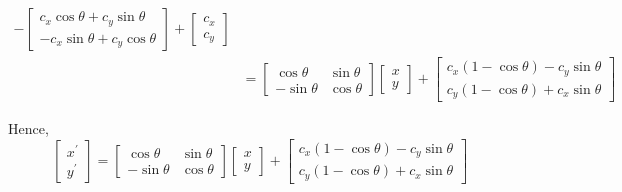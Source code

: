 \begin{equation*}
\begin{split}
          - \begin{bmatrix} c_{x}\cos\theta + c_{y}\sin\theta \\ -c_{x}\sin\theta + c_{y}\cos\theta \end{bmatrix} +
           \begin{bmatrix} c_{x} \\ c_{y} \end{bmatrix} \\
          &= \begin{bmatrix} \cos\theta & \sin\theta \\ -\sin\theta & \cos\theta \end{bmatrix} \begin{bmatrix} x \\ y \end{bmatrix}
          + \begin{bmatrix} c_{x}(1 - \cos\theta) - c_{y}\sin\theta \\ c_{y}(1 - \cos\theta) + c_{x}\sin\theta \end{bmatrix}
\end{split}
\end{equation*}

Hence,
\begin{equation}
  \begin{bmatrix}
   x^{'} \\ y^{'}
   \end{bmatrix}  = \begin{bmatrix} \cos\theta & \sin\theta \\ -\sin\theta & \cos\theta \end{bmatrix} \begin{bmatrix} x \\ y \end{bmatrix}
+ \begin{bmatrix} c_{x}(1 - \cos\theta) - c_{y}\sin\theta \\ c_{y}(1 - \cos\theta) + c_{x}\sin\theta \end{bmatrix}
\end{equation}

